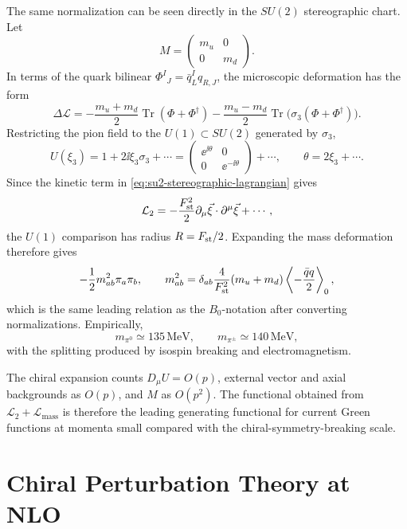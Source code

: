 The same normalization can be seen directly in the \(SU(2)\) stereographic
chart.  Let
\[
  M=\begin{pmatrix}m_u&0\\0&m_d\end{pmatrix}.
\]
In terms of the quark bilinear \(\Phi^I{}_{J}=\bar q_L^Iq_{R,J}\), the
microscopic deformation has the form
\[
  \Delta\mathcal L
  =
  -\frac{m_u+m_d}{2}
  \operatorname{Tr}(\Phi+\Phi^\dagger)
  -\frac{m_u-m_d}{2}
  \operatorname{Tr}\bigl(\sigma_3(\Phi+\Phi^\dagger)\bigr).
\]
Restricting the pion field to the \(U(1)\subset SU(2)\) generated by
\(\sigma_3\),
\[
  U(\xi_3)
  =
  1+2\ii\xi_3\sigma_3+\cdots
  =
  \begin{pmatrix}\ee^{\ii\theta}&0\\0&\ee^{-\ii\theta}\end{pmatrix}
  +\cdots ,
  \qquad
  \theta=2\xi_3+\cdots .
\]
Since the kinetic term in \eqref{eq:su2-stereographic-lagrangian} gives
\[
  \mathcal L_2=-\frac{F_{\rm st}^2}{2}\partial_\mu\vec\xi\cdot
  \partial^\mu\vec\xi+\cdots,
\]
the \(U(1)\) comparison has radius \(R=F_{\rm st}/2\).  Expanding the mass
deformation therefore gives
\[
  -\frac12 m_{ab}^2\pi_a\pi_b,
  \qquad
  m_{ab}^2
  =
  \delta_{ab}\frac{4}{F_{\rm st}^2}(m_u+m_d)
  \left\langle-\frac{\bar q q}{2}\right\rangle_0 ,
\]
which is the same leading relation as the \(B_0\)-notation after converting
normalizations.  Empirically,
\[
  m_{\pi^0}\simeq135\,\mathrm{MeV},
  \qquad
  m_{\pi^\pm}\simeq140\,\mathrm{MeV},
\]
with the splitting produced by isospin breaking and electromagnetism.

The chiral expansion counts \(D_\mu U=O(p)\), external vector and axial
backgrounds as \(O(p)\), and \(M\) as \(O(p^2)\).  The functional obtained from
\(\mathcal L_2+\mathcal L_{\mathrm{mass}}\) is therefore the leading
generating functional for current Green functions at momenta small compared
with the chiral-symmetry-breaking scale.

\section{Chiral Perturbation Theory at NLO}
\label{sec:chiral-perturbation-theory-nlo}

